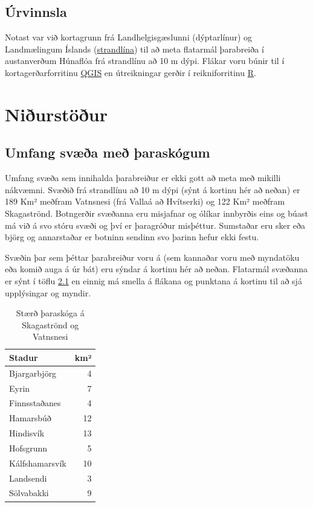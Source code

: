 \documentclass[icelandic,]{book}
\begin{document}
\hypertarget{urvinnsla}{%
\section{Úrvinnsla}\label{urvinnsla}}

Notast var við kortagrunn frá Landhelgisgæslunni (dýptarlínur) og Landmælingum Íslands (\href{https://atlas.lmi.is/LmiData/index.php?id=8613727663752}{strandlína}) til að meta flatarmál þarabreiða í austanverðum Húnaflóa frá strandlínu að 10 m dýpi. Flákar voru búnir til í kortagerðarforritinu \href{https://www.qgis.org/en/site/}{QGIS} en útreikningar gerðir í reikniforritinu \href{https://www.r-project.org/}{R}.

\hypertarget{niurstour}{%
\chapter{Niðurstöður}\label{niurstour}}

\hypertarget{umfang-sva-me-araskogum}{%
\section{Umfang svæða með þaraskógum}\label{umfang-sva-me-araskogum}}

Umfang svæða sem innihalda þarabreiður er ekki gott að meta með mikilli nákvæmni. Svæðið frá strandlínu að 10 m dýpi (sýnt á kortinu hér að neðan) er 189 Km² meðfram Vatnsnesi (frá Vallaá að Hvítserki) og 122 Km² meðfram Skagaströnd. Botngerðir svæðanna eru misjafnar og ólíkar innbyrðis eins og búast má við á svo stóru svæði og því er þaragróður misþéttur. Sumstaðar eru sker eða björg og annarstaðar er botninn sendinn svo þarinn hefur ekki festu.

Svæðin þar sem þéttar þarabreiður voru á (sem kannaðar voru með myndatöku eða komið auga á úr bát) eru sýndar á kortinu hér að neðan. Flatarmál svæðanna er sýnt í töflu \ref{tab:skogar} en einnig má smella á flákana og punktana á kortinu til að sjá upplýsingar og myndir.

\begin{table}[t]

\caption{\label{tab:skogar}Stærð þaraskóga á Skagaströnd og Vatnsnesi}
\centering
\begin{tabular}{lr}
\toprule
Stadur & km²\\
\midrule
Bjargarbjörg & 4\\
Eyrin & 7\\
Finnsstaðanes & 4\\
Hamarsbúð & 12\\
Hindisvík & 13\\
\addlinespace
Hofsgrunn & 5\\
Kálfshamarsvík & 10\\
Landsendi & 3\\
Sölvabakki & 9\\
\bottomrule
\end{tabular}
\end{table}
\end{document}

